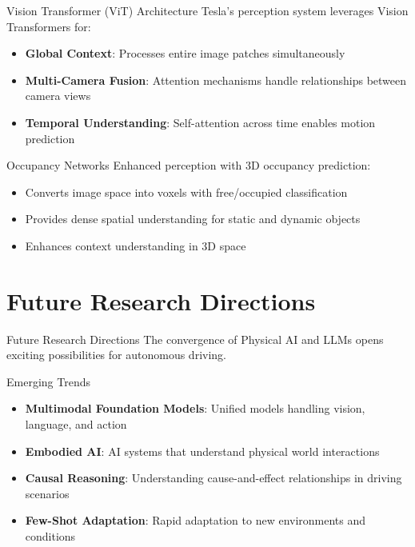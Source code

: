 \documentclass[aspectratio=169]{beamer}
\begin{document}
\begin{frame}{Vision Transformer (ViT) Architecture}
    Tesla's perception system leverages Vision Transformers for:
    
    \begin{itemize}
        \item \textbf{Global Context}: Processes entire image patches simultaneously
        \item \textbf{Multi-Camera Fusion}: Attention mechanisms handle relationships between camera views
        \item \textbf{Temporal Understanding}: Self-attention across time enables motion prediction
    \end{itemize}
\end{frame}

\begin{frame}{Occupancy Networks}
    Enhanced perception with 3D occupancy prediction:
    
    \begin{itemize}
        \item Converts image space into voxels with free/occupied classification
        \item Provides dense spatial understanding for static and dynamic objects
        \item Enhances context understanding in 3D space
    \end{itemize}
\end{frame}

\section{Future Research Directions}

\begin{frame}{Future Research Directions}
    The convergence of Physical AI and LLMs opens exciting possibilities for autonomous driving.
\end{frame}

\begin{frame}{Emerging Trends}
    \begin{itemize}
        \item \textbf{Multimodal Foundation Models}: Unified models handling vision, language, and action
        \item \textbf{Embodied AI}: AI systems that understand physical world interactions
        \item \textbf{Causal Reasoning}: Understanding cause-and-effect relationships in driving scenarios
        \item \textbf{Few-Shot Adaptation}: Rapid adaptation to new environments and conditions
    \end{itemize}
\end{frame}
\end{document}
